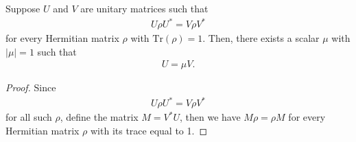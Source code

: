 \documentclass[10pt,a4paper]{amsart}
\begin{document}
    \begin{theorem}\label{thm:global-theorem}
        Suppose $U$ and $V$ are unitary matrices such that
        \begin{eqnarray*}
            U\rho U^* = V\rho V^*
        \end{eqnarray*}
        for every Hermitian matrix $\rho$ with $\mbox{Tr}(\rho)=1$. Then, there exists a scalar $\mu$ with $|\mu|=1$ such that
        \begin{eqnarray*}
            U = \mu V.
        \end{eqnarray*}
    \end{theorem}

    \begin{proof}
        Since
        \begin{eqnarray*}
        U\rho U^* = V\rho V^*
        \end{eqnarray*}
        for all such $\rho$, define the matrix $M = V^* U$, then we have  $M\rho = \rho M$ 
        for every Hermitian matrix $\rho$ with its trace equal to 1.
        

\end{proof}
\end{document}

